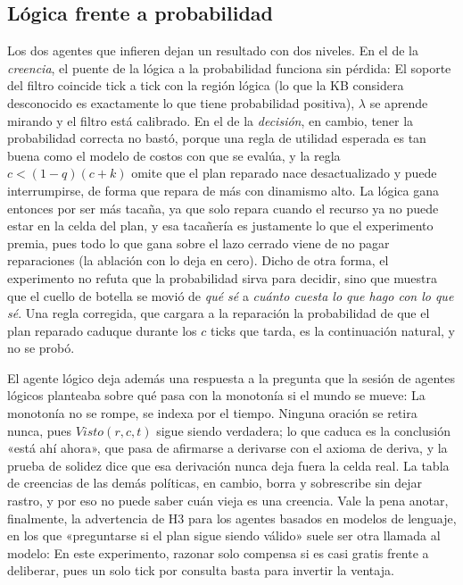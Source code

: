 \subsection{Lógica frente a probabilidad}

Los dos agentes que infieren dejan un resultado con dos niveles. En el de la \emph{creencia}, el puente de la lógica a la probabilidad funciona sin pérdida: El soporte del filtro coincide tick a tick con la región lógica (lo que la KB considera desconocido es exactamente lo que tiene probabilidad positiva), $\lambda$ se aprende mirando y el filtro está calibrado. En el de la \emph{decisión}, en cambio, tener la probabilidad correcta no bastó, porque una regla de utilidad esperada es tan buena como el modelo de costos con que se evalúa, y la regla $c<(1-q)(c+k)$ omite que el plan reparado nace desactualizado y puede interrumpirse, de forma que repara de más con dinamismo alto. La lógica gana entonces por ser más tacaña, ya que solo repara cuando el recurso ya no puede estar en la celda del plan, y esa tacañería es justamente lo que el experimento premia, pues todo lo que gana \KB{} sobre el lazo cerrado viene de no pagar reparaciones (la ablación con \ahora{} lo deja en cero). Dicho de otra forma, el experimento no refuta que la probabilidad sirva para decidir, sino que muestra que el cuello de botella se movió de \emph{qué sé} a \emph{cuánto cuesta lo que hago con lo que sé}. Una regla corregida, que cargara a la reparación la probabilidad de que el plan reparado caduque durante los $c$ ticks que tarda, es la continuación natural, y no se probó.

El agente lógico deja además una respuesta a la pregunta que la sesión de agentes lógicos planteaba sobre qué pasa con la monotonía si el mundo se mueve: La monotonía no se rompe, se indexa por el tiempo. Ninguna oración se retira nunca, pues $\mathit{Visto}(r,c,t)$ sigue siendo verdadera; lo que caduca es la conclusión «está ahí ahora», que pasa de afirmarse a derivarse con el axioma de deriva, y la prueba de solidez dice que esa derivación nunca deja fuera la celda real. La tabla de creencias de las demás políticas, en cambio, borra y sobrescribe sin dejar rastro, y por eso no puede saber cuán vieja es una creencia. Vale la pena anotar, finalmente, la advertencia de H3 para los agentes basados en modelos de lenguaje, en los que «preguntarse si el plan sigue siendo válido» suele ser otra llamada al modelo: En este experimento, razonar solo compensa si es casi gratis frente a deliberar, pues un solo tick por consulta basta para invertir la ventaja.

